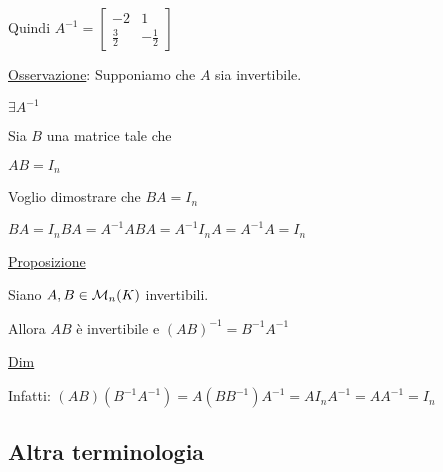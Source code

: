 \documentclass{article}
\begin{document}
\begin{enumerate}
	      Quindi $A^{-1}=\begin{bmatrix}-2&1\\\frac{3}{2}&-\frac{1}{2}\end{bmatrix}$

	      \ul{Osservazione}: Supponiamo che $A$ sia invertibile.

	      $\exists A^{-1}$

	      Sia $B$ una matrice tale che

	      $AB=I_n$

	      Voglio dimostrare che $BA=I_n$

	      $BA=I_nBA=A^{-1}ABA=A^{-1}I_nA=A^{-1}A=I_n$
\end{enumerate}

\ul{Proposizione}

Siano $A,B\in\mathcal{M}_n(K)$ invertibili.

Allora $AB$ è invertibile e $(AB)^{-1}=B^{-1}A^{-1}$

\ul{Dim}

Infatti: $(AB)(B^{-1}A^{-1})=A(BB^{-1})A^{-1}=AI_nA^{-1}=AA^{-1}=I_n$

\subsection*{Altra terminologia}
\end{document}
